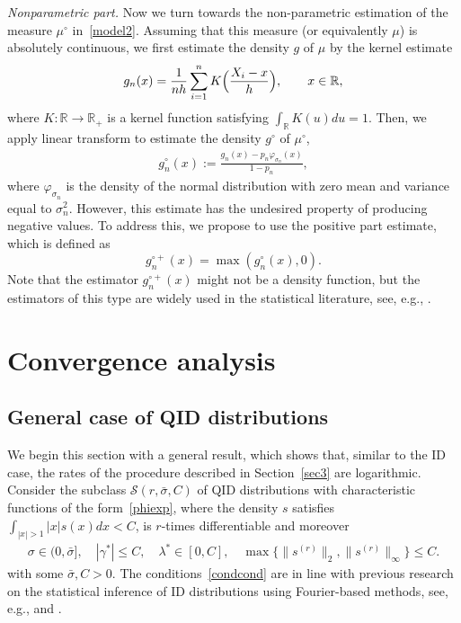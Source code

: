 \documentclass[a4paper,11pt]{article}
\theoremstyle{definition}
\newcommand{\R}{{\mathbb{R}}}
\newcommand{\1}{\mathbb{I}}
\def\R{\mathbb{R}}
\theoremstyle{remark}
\begin{document}
\textit{Nonparametric part.} Now we turn towards the non-parametric estimation of the measure \(\mu^\circ\) in~\eqref{model2}. Assuming that this measure (or equivalently \(\mu\)) is absolutely continuous, we first estimate the density \(g\) of  \(\mu\) by the kernel estimate 
\begin{eqnarray*}
g_n(x) =  \frac{1}{nh}\sum_{i = 1}^{n} K\Bigl(\frac{X_i - x}{h}\Bigr), \qquad x \in \R,
\end{eqnarray*}
where $K: \R \to \R_{+}$ is a kernel function satisfying \(\int_{\R} K(u) du = 1\). Then, we apply linear transform to estimate the density \(g^\circ\) of \(\mu^\circ\),
\begin{eqnarray}\label{g_n_estim}
g^{\circ}_{n} (x) := \frac{g_n (x)- p_n \varphi_{\sigma_n}(x) }{1- p_n},
\end{eqnarray}
where \(\varphi_{\sigma_n}\) is the density of the normal distribution with zero mean and variance equal to \(\sigma_n^2.\) However, this estimate has the undesired property of producing negative values. To address this, we propose to use the positive part estimate, which is defined as
\begin{equation}\label{pos_part_g_n}
    g^{\circ +}_{n} (x) = \max(g^{\circ}_{n} (x), 0).
\end{equation}
Note that the estimator \(g^{\circ +}_{n} (x)\) might not be a density function, but the estimators of this type are widely used in the statistical literature, see, e.g., \cite{Tsybakov}.

\section{Convergence analysis}\label{sec5}
\subsection{General case of QID distributions}
\label{sec6}
We begin this section with a  general result, which shows that, similar to the ID case, the rates of the procedure described in Section~\ref{sec3} are logarithmic.
Consider the subclass $\mathcal{S}(r, \bar{\sigma}, C)$ of QID distributions with characteristic functions of the form~\eqref{phiexp}, where the density \(s\) satisfies \(\int_{|x|>1 }|x| s(x)dx < C\), is \(r\)-times differentiable and moreover
\begin{eqnarray}\label{condcond}
\sigma \in (0, \bar\sigma],  \quad |\gamma^*| \leq C, \quad \lambda^* \in [0, C], \quad \max\bigl\{
\| s^{(r)}\|_2, \| s^{(r)}\|_\infty\bigr\} \leq C.
\end{eqnarray}
with some $\bar\sigma, C >0$.
The conditions~\eqref{condcond} are in line with previous research on the statistical inference of ID distributions using Fourier-based methods, see, e.g.,  \cite{BR2015} and \cite{Gugu}.
\end{document}
